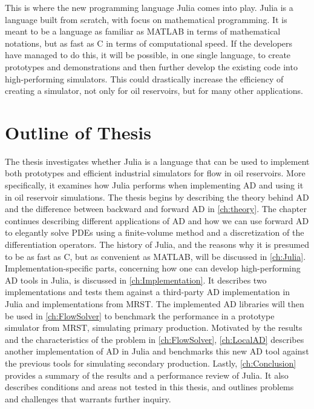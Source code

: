 This is where the new programming language Julia comes into play. Julia is a language built from scratch, with focus on mathematical programming. It is meant to be a language as familiar as MATLAB in terms of mathematical notations, but as fast as C in terms of computational speed. If the developers have managed to do this, it will be possible, in one single language, to create prototypes and demonstrations and then further develop the existing code into high-performing simulators. This could drastically increase the efficiency of creating a simulator, not only for oil reservoirs, but for many other applications. 

\section{Outline of Thesis}
The thesis investigates whether Julia is a language that can be used to implement both prototypes and efficient industrial simulators for flow in oil reservoirs. More specifically, it examines how Julia performs when implementing AD and using it in oil reservoir simulations. The thesis begins by describing the theory behind AD and the difference between backward and forward AD in \autoref{ch:theory}. The chapter continues describing different applications of AD and how we can use forward AD to elegantly solve PDEs using a finite-volume method and a discretization of the differentiation operators. The history of Julia, and the reasons why it is presumed to be as fast as C, but as convenient as MATLAB, will be discussed in \autoref{ch:Julia}. Implementation-specific parts, concerning how one can develop high-performing AD tools in Julia, is discussed in \autoref{ch:Implementation}. It describes two implementations and tests them against a third-party AD implementation in Julia and implementations from MRST. The implemented AD libraries will then be used in \autoref{ch:FlowSolver} to benchmark the performance in a prototype simulator from MRST, simulating primary production. Motivated by the results and the characteristics of the problem in \autoref{ch:FlowSolver}, \autoref{ch:LocalAD} describes another implementation of AD in Julia and benchmarks this new AD tool against the previous tools for simulating secondary production. Lastly, \autoref{ch:Conclusion} provides a summary of the results and a performance review of Julia. It also describes conditions and areas not tested in this thesis, and outlines problems and challenges that warrants further inquiry.